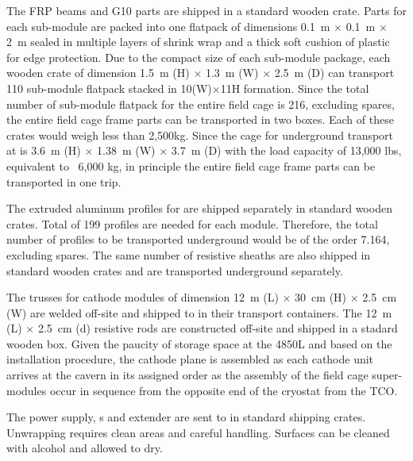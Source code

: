 The  FRP beams and G10 parts are shipped in a standard wooden crate.  Parts for each sub-module are packed into one %
flatpack of dimensions \SI{0.1}{\m} $\times$ \SI{0.1}{\m} $\times$ \SI{2}{\m} sealed in multiple layers of shrink wrap and a thick soft cushion of plastic for edge protection. Due to the compact size of each sub-module package, each wooden crate of dimension \SI{1.5}{\m} (H) $\times$ \SI{1.3}{\m} (W) $\times$ \SI{2.5}{\m} (D) can transport 110 sub-module flatpack stacked in 10(W)$\times$11{H} formation.
Since the total number of sub-module flatpack for the entire field cage is \num{216}, excluding spares, the entire field cage frame parts can be transported in two boxes. 
Each of these crates would weigh less than 2,500kg.
Since the cage for underground transport at \surf is 
\SI{3.6}{\m} (H) $\times$ \SI{1.38}{\m} (W) $\times$ \SI{3.7}{\m} (D) with the load capacity of 13,000 lbs, equivalent to ~6,000 kg, in principle the entire field cage frame parts can be transported in one trip.

The extruded aluminum profiles for  are shipped separately in  standard wooden crates. Total of \num{199} profiles are needed for each \tpcheight module. Therefore, the total number of profiles to be transported underground would be of the order \num{7,164}, excluding spares. The same number of resistive sheaths are also shipped in standard wooden crates and are transported underground separately. 

The trusses for cathode modules of dimension \SI{12}{\m} (L) $\times$ \SI{30}{\cm} (H) $\times$ \SI{2.5}{\cm} (W) are welded off-site and shipped to \surf in their transport containers. 
The \SI{12}{\m} (L) $\times$ \SI{2.5}{\cm} (d) resistive rods are constructed off-site and shipped in a stadard wooden box.  Given the paucity of storage space at the 4850L and based on the installation procedure, the cathode plane is assembled as each cathode unit arrives at the cavern in its assigned order as the assembly of the field cage super-modules occur in sequence from the opposite end of the cryostat from the TCO.

The power supply, \fdth{}s and  extender are sent to \surf in standard shipping crates. Unwrapping requires clean areas and careful handling. Surfaces can be cleaned with alcohol and allowed to dry.

